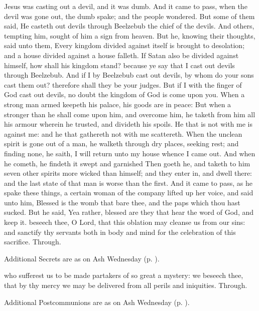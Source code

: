  Jesus was casting out a devil, and it was dumb. And it came to pass, when the devil was gone out, the dumb spake; and the people wondered. But some of them said, He casteth out devils through Beelzebub the chief of the devils. And others, tempting him, sought of him a sign from heaven. But he, knowing their thoughts, said unto them, Every kingdom divided against itself is brought to desolation; and a house divided against a house falleth. If Satan also be divided against himself, how shall his kingdom stand? because ye say that I cast out devils through Beelzebub. And if I by Beelzebub cast out devils, by whom do your sons cast them out? therefore shall they be your judges. But if I with the finger of God cast out devils, no doubt the kingdom of God is come upon you. When a strong man armed keepeth his palace, his goods are in peace: But when a stronger than he shall come upon him, and overcome him, he taketh from him all his armour wherein he trusted, and divideth his spoils. He that is not with me is against me: and he that gathereth not with me scattereth. When the unclean spirit is gone out of a man, he walketh through dry places, seeking rest; and finding none, he saith, I will return unto my house whence I came out. And when he cometh, he findeth it swept and garnished Then goeth he, and taketh to him seven other spirits more wicked than himself; and they enter in, and dwell there: and the last state of that man is worse than the first. And it came to pass, as he spake these things, a certain woman of the company lifted up her voice, and said unto him, Blessed is the womb that bare thee, and the paps which thou hast sucked. But he said, Yea rather, blessed are they that hear the word of God, and keep it.
\secret
{} beseech thee, O Lord, that this oblation may cleanse us from our sins: and sanctify thy servants both in body and mind for the celebration of this sacrifice. Through.
\begin{rubric}
    Additional Secrets are as on Ash Wednesday (p. \pageref{AshWednesdayMassSecret}).
\end{rubric}
\postcommunion
{} who sufferest us to be made partakers of so great a mystery: we beseech thee, that by thy mercy we may be delivered from all perils and iniquities. Through.
\begin{rubric}
    Additional Postcommunions are as on Ash Wednesday (p. \pageref{AshWednesdayMassPostcommunion}).
\end{rubric}

